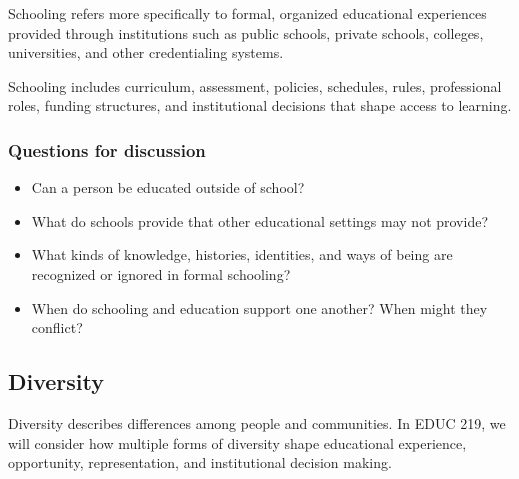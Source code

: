 \documentclass[
  letterpaper,
  DIV=11,
  numbers=noendperiod]{scrartcl}
\providecommand{\tightlist}{%
  \setlength{\itemsep}{0pt}\setlength{\parskip}{0pt}}\usepackage{longtable,booktabs,array}
\begin{document}
\begin{tcolorbox}[enhanced jigsaw, colframe=quarto-callout-note-color-frame, rightrule=.15mm, opacitybacktitle=0.6, leftrule=.75mm, colback=white, breakable, coltitle=black, arc=.35mm, bottomrule=.15mm, titlerule=0mm, left=2mm, colbacktitle=quarto-callout-note-color!10!white, title=\textcolor{quarto-callout-note-color}{\faInfo}\hspace{0.5em}{Schooling}, toprule=.15mm, bottomtitle=1mm, toptitle=1mm, opacityback=0]

Schooling refers more specifically to formal, organized educational
experiences provided through institutions such as public schools,
private schools, colleges, universities, and other credentialing
systems.

Schooling includes curriculum, assessment, policies, schedules, rules,
professional roles, funding structures, and institutional decisions that
shape access to learning.

\end{tcolorbox}

\subsubsection{Questions for discussion}\label{questions-for-discussion}

\begin{itemize}
\tightlist
\item
  Can a person be educated outside of school?
\item
  What do schools provide that other educational settings may not
  provide?
\item
  What kinds of knowledge, histories, identities, and ways of being are
  recognized or ignored in formal schooling?
\item
  When do schooling and education support one another? When might they
  conflict?
\end{itemize}

\subsection{Diversity}\label{diversity}

Diversity describes differences among people and communities. In EDUC
219, we will consider how multiple forms of diversity shape educational
experience, opportunity, representation, and institutional decision
making.
\end{document}
